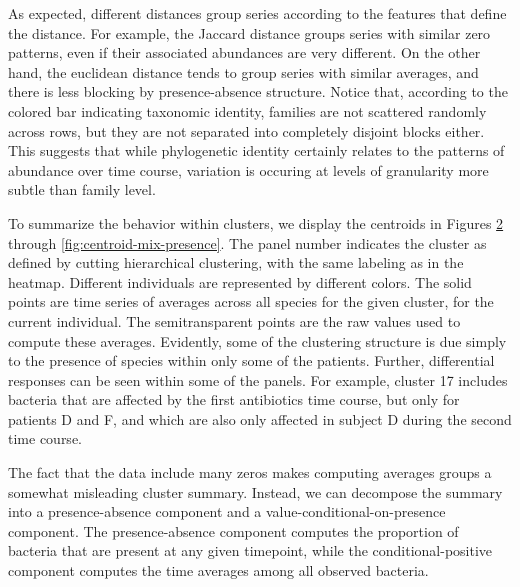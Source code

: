 \documentclass{article}
\begin{document}
\begin{figure}[ht]
  \centering
  \caption{\label{fig:heatmap-innovations-bin} }
\end{figure}

As expected, different distances group series according to the features that
define the distance. For example, the Jaccard distance groups series with
similar zero patterns, even if their associated abundances are very different.
On the other hand, the euclidean distance tends to group series with similar
averages, and there is less blocking by presence-absence structure. Notice that,
according to the colored bar indicating taxonomic identity, families are not
scattered randomly across rows, but they are not separated into completely
disjoint blocks either. This suggests that while phylogenetic identity certainly
relates to the patterns of abundance over time course, variation is occuring at
levels of granularity more subtle than family level.

To summarize the behavior within clusters, we display the centroids in Figures
\ref{fig:centroid-euclidean-conditional} through
\ref{fig:centroid-mix-presence}. The panel number indicates the cluster as
defined by cutting hierarchical clustering, with the same labeling as in the
heatmap. Different individuals are represented by different colors. The solid
points are time series of averages across all species for the given cluster, for
the current individual. The semitransparent points are the raw values used to
compute these averages. Evidently, some of the clustering structure is due
simply to the presence of species within only some of the patients. Further,
differential responses can be seen within some of the panels. For example,
cluster 17 includes bacteria that are affected by the first antibiotics time
course, but only for patients D and F, and which are also only affected in
subject D during the second time course.

The fact that the data include many zeros makes computing averages groups a
somewhat misleading cluster summary. Instead, we can decompose the summary into
a presence-absence component and a value-conditional-on-presence component.
The presence-absence component computes the proportion of bacteria that are
present at any given timepoint, while the conditional-positive component
computes the time averages among all observed bacteria.

\begin{figure}[ht]
  \centering
  \caption{\label{fig:centroid-euclidean-conditional} }
\end{figure}
\end{document}
